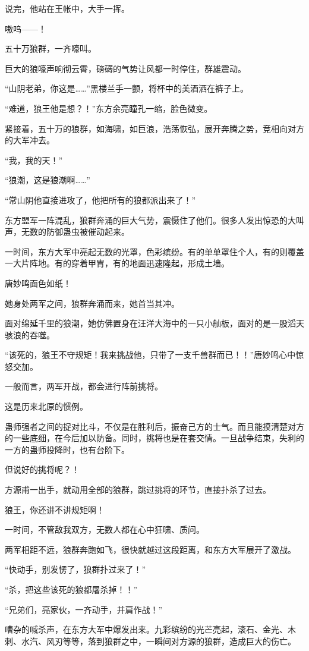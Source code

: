 \begin{this_body}
说完，他站在王帐中，大手一挥。

嗷呜——！

五十万狼群，一齐嚎叫。

巨大的狼嚎声响彻云霄，磅礴的气势让风都一时停住，群雄震动。

“山阴老弟，你这是……”黑楼兰手一颤，将杯中的美酒洒在裤子上。

“难道，狼王他是想？！”东方余亮瞳孔一缩，脸色微变。

紧接着，五十万的狼群，如海啸，如巨浪，浩荡恢弘，展开奔腾之势，竞相向对方的大军冲去。

“我，我的天！”

“狼潮，这是狼潮啊……”

“常山阴他直接进攻了，他把所有的狼都派出来了！”

东方盟军一阵混乱，狼群奔涌的巨大气势，震慑住了他们。很多人发出惊恐的大叫声，无数的防御蛊虫被催动起来。

一时间，东方大军中亮起无数的光罩，色彩缤纷。有的单单罩住个人，有的则覆盖一大片阵地。有的穿着甲胄，有的地面迅速隆起，形成土墙。

唐妙鸣面色如纸！

她身处两军之间，狼群奔涌而来，她首当其冲。

面对绵延千里的狼潮，她仿佛置身在汪洋大海中的一只小舢板，面对的是一股滔天骇浪的吞噬。

“该死的，狼王不守规矩！我来挑战他，只带了一支千兽群而已！！”唐妙鸣心中惊怒交加。

一般而言，两军开战，都会进行阵前挑将。

这是历来北原的惯例。

蛊师强者之间的捉对比斗，不仅是在胜利后，振奋己方的士气。而且能摸清楚对方的一些底细，在今后加以防备。同时，挑将也是在套交情。一旦战争结束，失利的一方的蛊师投降时，也有台阶下。

但说好的挑将呢？！

方源甫一出手，就动用全部的狼群，跳过挑将的环节，直接扑杀了过去。

狼王，你还讲不讲规矩啊！

一时间，不管敌我双方，无数人都在心中狂啸、质问。

两军相距不远，狼群奔跑如飞，很快就越过这段距离，和东方大军展开了激战。

“快动手，别发愣了，狼群扑过来了！”

“杀，把这些该死的狼都屠杀掉！！”

“兄弟们，亮家伙，一齐动手，并肩作战！”

嘈杂的喊杀声，在东方大军中爆发出来。九彩缤纷的光芒亮起，滚石、金光、木刺、水汽、风刃等等，落到狼群之中，一瞬间对方源的狼群，造成巨大的伤亡。


\end{this_body}
